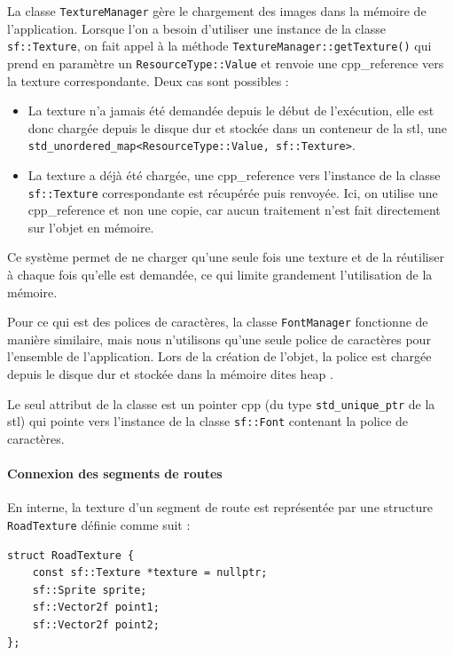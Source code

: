 La classe \texttt{TextureManager} gère le chargement des images dans la mémoire de l'application.
Lorsque l'on a besoin d'utiliser une instance de la classe \texttt{sf::Texture}\cite{sfml_sf_texture}, on fait appel à la méthode \texttt{TextureManager::getTexture()} qui prend en paramètre un \texttt{ResourceType::Value} et renvoie une \gls{cpp_reference} vers la texture correspondante.
Deux cas sont possibles :
\begin{itemize}
    \item La texture n'a jamais été demandée depuis le début de l'exécution, elle est donc chargée depuis le disque dur et stockée dans un conteneur de la \gls{stl}, une \texttt{\gls{std_unordered_map}<ResourceType::Value, sf::Texture>}\cite{cpp_reference_std_unordered_map}.
    \item La texture a déjà été chargée, une \gls{cpp_reference} vers l'instance de la classe \texttt{sf::Texture}\cite{sfml_sf_texture} correspondante est récupérée puis renvoyée.
    Ici, on utilise une \gls{cpp_reference} et non une copie, car aucun traitement n'est fait directement sur l'objet en mémoire.
\end{itemize}
Ce système permet de ne charger qu'une seule fois une texture et de la réutiliser à chaque fois qu'elle est demandée, ce qui limite grandement l'utilisation de la mémoire.

Pour ce qui est des polices de caractères, la classe \texttt{FontManager} fonctionne de manière similaire, mais nous n'utilisons qu'une seule police de caractères pour l'ensemble de l'application.
Lors de la création de l'objet, la police est chargée depuis le disque dur et stockée dans la mémoire dites \og \gls{heap} \fg{}.

Le seul attribut de la classe est un \gls{pointer} \gls{cpp} (du type \texttt{\gls{std_unique_ptr}}\cite{cpp_reference_std_unique_ptr} de la \gls{stl}) qui pointe vers l'instance de la classe \texttt{sf::Font} contenant la police de caractères.

\paragraph{Connexion des segments de routes}
En interne, la texture d'un segment de route est représentée par une structure \texttt{RoadTexture} définie comme suit :

\begin{lstlisting}[style=CStyle,label={lst:struct_roadtexture}]
struct RoadTexture {
    const sf::Texture *texture = nullptr;
    sf::Sprite sprite;
    sf::Vector2f point1;
    sf::Vector2f point2;
};
\end{lstlisting}

